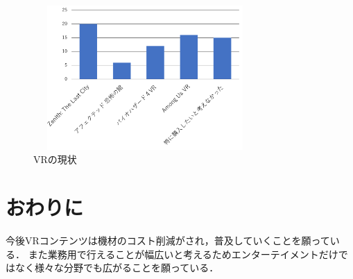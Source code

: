 \documentclass[twocolumn,10pt,a4j]{ltjsarticle}
\begin{document}
\begin{figure}[h]
\begin{center}
 \includegraphics[clip,width=85mm,height=55mm]{購入したいと考えたvrコンテンツ.pdf}
\end{center}
 \caption{VRの現状}
 \label{fig:購入したいと考えたvrコンテンツ.pdf}
\end{figure}

\section{おわりに}
今後VRコンテンツは機材のコスト削減がされ，普及していくことを願っている．
また業務用で行えることが幅広いと考えるためエンターテイメントだけではなく様々な分野でも広がることを願っている．


\end{document}
